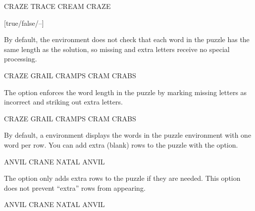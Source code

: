 \documentclass[svgnames]{report}
\begin{document}
  \begin{example}
  \begin{wordle}[noletters]{CRAZE}
    TRACE
    CREAM
    CRAZE
  \end{wordle}
  \end{example}

  [true/false/--]

  By default, the  environment does not check that each
  word in the puzzle has the same length as the solution, so missing
  and extra letters receive no special processing.

  \begin{example}
  \begin{wordle}[strict=false]{CRAZE} %
    GRAIL
    CRAMPS
    CRAM
    CRABS
  \end{wordle}
  \end{example}

  The  option enforces the word length in the puzzle by
  marking missing letters as incorrect and striking out extra letters.

  \begin{example}
  \begin{wordle}[strict]{CRAZE}
    GRAIL
    CRAMPS
    CRAM
    CRABS
  \end{wordle}
  \end{example}


  By default, a  environment displays the words
  in the puzzle environment with one word per row. You can add extra
  (blank) rows to the puzzle with the  option.

  \begin{example}
  \begin{wordle}[rows=4]{ANVIL}
    CRANE
    NATAL
    ANVIL
  \end{wordle}
  \end{example}

  The  option only adds extra rows to the puzzle if they
  are needed. This option does not prevent ``extra'' rows from
  appearing.

  \begin{example}
  \begin{wordle}[rows=2]{ANVIL}
    CRANE
    NATAL
    ANVIL
  \end{wordle}
  \end{example}


  \option[]{*}
\end{document}
